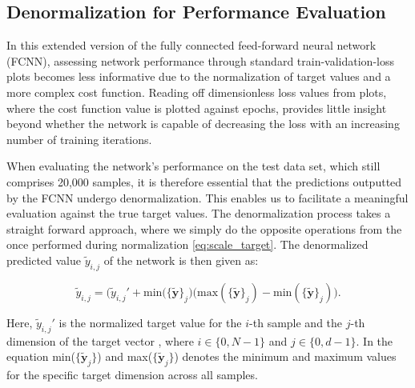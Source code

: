 \documentclass[a4paper, UKenglish, 11pt]{uiomaster}
\begin{document}
\subsection{Denormalization for Performance Evaluation}
In this extended version of the fully connected feed-forward neural network (FCNN), assessing network performance through standard train-validation-loss plots becomes less informative due to the normalization of target values and a more complex cost function. Reading off dimensionless loss values from plots, where the cost function value is plotted against epochs, provides little insight beyond whether the network is capable of decreasing the loss with an increasing number of training iterations.

When evaluating the network's performance on the test data set, which still comprises 20,000 samples, it is therefore essential that the predictions outputted by the FCNN undergo denormalization. This enables us to facilitate a meaningful evaluation against the true target values. The denormalization process takes a straight forward approach, where we simply do the opposite operations from the once performed during normalization \ref{eq:scale_target}. The denormalized predicted value $\tilde{y}_{i,j}$ of the network is then given as:

\begin{equation}
\tilde{y}_{i,j} = \biggl(\tilde{y}_{i,j}' + \text{min}(\{\tilde{\mathbf{y}}\}_j\biggr) \biggl(\text{max}(\{\tilde{\mathbf{y}}\}_j) - \text{min}(\{\tilde{\mathbf{y}}\}_j)\biggr).
\label{eq:de_scale_target}
\end{equation}

Here, $\tilde{y}_{i,j}'$ is the normalized target value for the $i$-th sample and the $j$-th dimension of the target vector , where $i \in \{0, N-1\}$ and $j \in \{0, d-1\}$. In the equation min($\{\tilde{\mathbf{y}}_j\}$) and max($\{\tilde{\mathbf{y}}_j\}$) denotes the minimum and maximum values for the specific target dimension across all samples.

%
\end{document}
